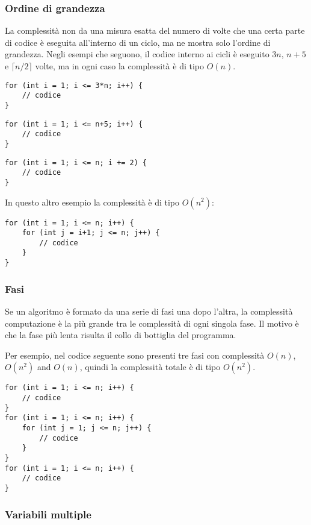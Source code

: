 \subsubsection*{Ordine di grandezza}

La complessità non da una misura esatta del numero
di volte che una certa parte di codice è eseguita all'interno di un ciclo,
ma ne mostra solo l'ordine di grandezza.
Negli esempi che seguono, il codice interno ai cicli
è eseguito $3n$, $n+5$ e $\lceil n/2 \rceil$ volte,
ma in ogni caso la complessità è di tipo $O(n)$.

\begin{lstlisting}
for (int i = 1; i <= 3*n; i++) {
    // codice
}
\end{lstlisting}

\begin{lstlisting}
for (int i = 1; i <= n+5; i++) {
    // codice
}
\end{lstlisting}

\begin{lstlisting}
for (int i = 1; i <= n; i += 2) {
    // codice
}
\end{lstlisting}

In questo altro esempio la complessità è di tipo $O(n^2)$:

\begin{lstlisting}
for (int i = 1; i <= n; i++) {
    for (int j = i+1; j <= n; j++) {
        // codice
    }
}
\end{lstlisting}

\subsubsection*{Fasi}

Se un algoritmo è formato da una serie di fasi una dopo l'altra,
la complessità computazione è la più grande 
tra le complessità di ogni singola fase.
Il motivo è che
la fase più lenta risulta il collo di bottiglia del programma.

Per esempio, nel codice seguente sono presenti
tre fasi con complessità
$O(n)$, $O(n^2)$ and $O(n)$, quindi la complessità totale è di tipo $O(n^2)$.

\begin{lstlisting}
for (int i = 1; i <= n; i++) {
    // codice
}
for (int i = 1; i <= n; i++) {
    for (int j = 1; j <= n; j++) {
        // codice
    }
}
for (int i = 1; i <= n; i++) {
    // codice
}
\end{lstlisting}

\subsubsection*{Variabili multiple}


